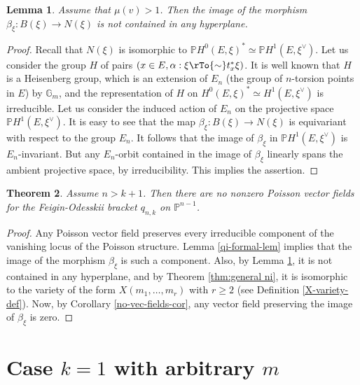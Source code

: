 \documentclass[reqno]{amsart}
\newtheorem{theorem}{Theorem}[section]
\newtheorem{lemma}[theorem]{Lemma}
\theoremstyle{definition}
\theoremstyle{remark}
\newcommand{\G}{{\mathbb G}}
\renewcommand{\P}{{\mathbb P}}
\renewcommand{\a}{\alpha}
\renewcommand{\b}{\beta}
\numberwithin{equation}{section}
\begin{document}


\begin{lemma}\label{nondeg-Xp-lem} 
Assume that $\mu(v)>1$. Then the image of the morphism $\beta_\xi:B(\xi)\to N(\xi)$
 is not contained in any hyperplane.
\end{lemma}

\begin{proof} 
Recall that $N(\xi)$ is isomorphic to $\P H^0(E,\xi)^*\simeq \P H^1(E,\xi^\vee)$.
Let us consider the group $H$ of pairs $(x\in E, \a:\xi\rTo{\sim} t_x^*\xi)$. It is well known that $H$ is a Heisenberg group,
which is an extension of $E_n$ (the group of $n$-torsion points in $E$) by $\G_m$, and the representation of $H$ on $H^0(E,\xi)^*\simeq H^1(E,\xi^\vee)$
is irreducible. Let us consider the induced action of $E_n$ on the projective space $\P H^1(E,\xi^\vee)$.
It is easy to see that the map $\beta_\xi: B(\xi)\to N(\xi)$ is equivariant with respect to the group $E_n$.
It follows that the image of $\beta_\xi$ in $\P H^1(E,\xi^\vee)$ is $E_n$-invariant. But any $E_n$-orbit contained in the image of $\beta_\xi$ linearly spans the ambient projective space, by irreducibility.
This implies the assertion.
\end{proof}


\begin{theorem} \label{thm:nosym}
Assume $n>k+1$. Then there are no nonzero Poisson vector fields for the Feigin-Odesskii bracket
$q_{n,k}$ on $\P^{n-1}$.
\end{theorem}

\begin{proof} Any Poisson vector field preserves every irreducible component of the vanishing locus of the Poisson structure. Lemma \ref{qi-formal-lem} implies that
the image of the morphism $\b_\xi$ is such a component. Also, by Lemma \ref{nondeg-Xp-lem}, it is not contained in any hyperplane, and by
Theorem \ref{thm:general ni}, it is isomorphic to the variety of the form $X(m_1,\ldots,m_r)$ with $r\ge 2$ (see Definition \ref{X-variety-def}). Now, by Corollary \ref{no-vec-fields-cor}, any vector field preserving the
image of $\b_\xi$ is zero.
\end{proof}

\section{Case $k=1$ with arbitrary $m$}\label{sec:p=1}
\end{document}
